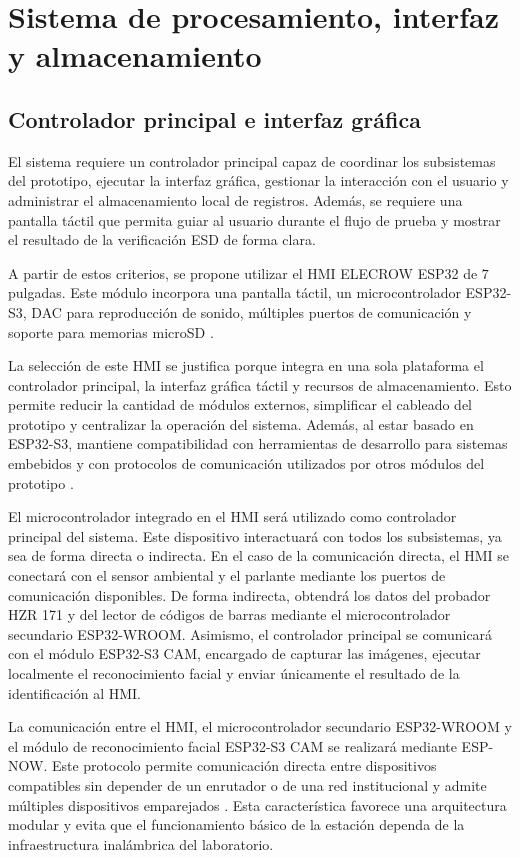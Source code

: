 \section{Sistema de procesamiento, interfaz y almacenamiento}

\subsection{Controlador principal e interfaz gráfica}

El sistema requiere un controlador principal capaz de coordinar los subsistemas
del prototipo, ejecutar la interfaz gráfica, gestionar la interacción con el
usuario y administrar el almacenamiento local de registros. Además, se requiere
una pantalla táctil que permita guiar al usuario durante el flujo de prueba y
mostrar el resultado de la verificación ESD de forma clara.

A partir de estos criterios, se propone utilizar el HMI ELECROW ESP32 de
$7$ pulgadas. Este módulo incorpora una pantalla táctil, un microcontrolador
ESP32-S3, DAC para reproducción de sonido, múltiples puertos de comunicación y
soporte para memorias microSD \cite{ElecrowESP32HMIManual}.

La selección de este HMI se justifica porque integra en una sola plataforma el
controlador principal, la interfaz gráfica táctil y recursos de almacenamiento.
Esto permite reducir la cantidad de módulos externos, simplificar el cableado
del prototipo y centralizar la operación del sistema. Además, al estar basado en
ESP32-S3, mantiene compatibilidad con herramientas de desarrollo para sistemas
embebidos y con protocolos de comunicación utilizados por otros módulos del
prototipo \cite{esp32s3}.

El microcontrolador integrado en el HMI será utilizado como controlador principal
del sistema. Este dispositivo interactuará con todos los subsistemas, ya sea de
forma directa o indirecta. En el caso de la comunicación directa, el HMI se
conectará con el sensor ambiental y el parlante mediante los puertos de
comunicación disponibles. De forma indirecta, obtendrá los datos del probador
HZR 171 y del lector de códigos de barras mediante el microcontrolador
secundario ESP32-WROOM. Asimismo, el controlador principal se comunicará con el
módulo ESP32-S3 CAM, encargado de capturar las imágenes, ejecutar localmente el
reconocimiento facial y enviar únicamente el resultado de la identificación al
HMI. 

La comunicación entre el HMI, el microcontrolador secundario ESP32-WROOM y el
módulo de reconocimiento facial ESP32-S3 CAM se realizará mediante ESP-NOW. Este
protocolo permite comunicación directa entre dispositivos compatibles sin
depender de un enrutador o de una red institucional y admite múltiples
dispositivos emparejados \cite{espressif_espnow}. Esta característica favorece
una arquitectura modular y evita que el funcionamiento básico de la estación
dependa de la infraestructura inalámbrica del laboratorio.


